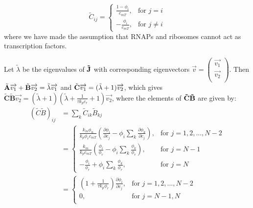 \documentclass[10pt]{article}
\begin{document}
\begin{equation}
    \tilde{C}_{ij} = \begin{cases}
    \frac{1-\phi_i}{c_{mT}}, & \text{for $j=i$} \\
    -\frac{\phi_i}{c_{mT}}, & \text{for $j \neq i$}
    \end{cases}
\end{equation}
where we have made the assumption that RNAPs and ribosomes cannot act as transcription factors.

Let $\tilde{\lambda}$ be the eigenvalues of $\bf{\tilde{J}}$ with corresponding eigenvectors  $\overrightarrow{v} = \left(\begin{array}{c}
\overrightarrow{v_1}  \\
\overrightarrow{v_2}  \\
\end{array} \right)$. Then $\tilde{\bf{A}} \overrightarrow{v_1} + \tilde{\bf{B}} \overrightarrow{v_2} = \tilde{\lambda} \overrightarrow{v_1}$ and $\tilde{\bf{C}}\overrightarrow{v_1} = (\tilde{\lambda}+1) \overrightarrow{v_2}$, which gives $\tilde{\textbf{C}}\tilde{\textbf{B}} \overrightarrow{v_2} = (\tilde{\lambda}+1) \left(\tilde{\lambda} + \frac{1}{\tau k_p c_r} + 1 \right) \overrightarrow{v_2}$, where the elements of $\bf{\tilde{C}\tilde{B}}$ are given by:
\begin{equation}
\begin{split}
    (\tilde{C}\tilde{B})_{ij} &= \sum_k \tilde{C}_{ik} \tilde{B}_{kj} \\ 
        &= \begin{cases}
    \frac{k_m \phi_n}{k_p \phi_r c_{mT}} \left(\frac{\partial \phi_i}{\partial c_j} - \phi_i \sum_k \frac{\partial \phi_k}{\partial c_j} \right), & \text{for $j=1,2,...,N-2$} \\
    \frac{k_m}{k_p c_{mT}} \left( \frac{\phi_i}{\phi_r} - \phi_i \sum_k \frac{\phi_k}{\phi_r} \right), & \text{for $j=N-1$} \\
    -\frac{\phi_i}{\phi_r} + \phi_i \sum_k \frac{\phi_k}{\phi_r}, & \text{for $j=N$}
    \end{cases} \\
    &= \begin{cases}
    \left(1+\frac{1}{\tau k_p \phi_r} \right) \frac{\partial \phi_i}{\partial c_j}, & \text{for $j=1,2,...,N-2$} \\
    0, & \text{for $j=N-1,N$} \\
    \end{cases}
\end{split}
\end{equation}
\end{document}
